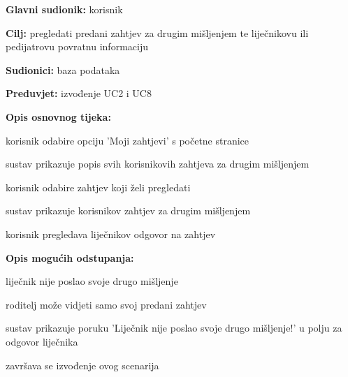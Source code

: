                     \noindent {}
					\begin{packed_item}
	
						\item \textbf{Glavni sudionik: }korisnik
						\item  \textbf{Cilj:} pregledati predani zahtjev za drugim mišljenjem te liječnikovu ili pedijatrovu povratnu informaciju 
						\item  \textbf{Sudionici:} baza podataka
						\item  \textbf{Preduvjet:} izvođenje UC2 i UC8
						\item  \textbf{Opis osnovnog tijeka:}
						
						\item[] \begin{packed_enum}
	
							\item korisnik odabire opciju 'Moji zahtjevi' s početne stranice
							\item sustav prikazuje popis svih korisnikovih zahtjeva za drugim mišljenjem
							\item korisnik odabire zahtjev koji želi pregledati
                            \item sustav prikazuje korisnikov zahtjev za drugim mišljenjem
                            \item korisnik pregledava liječnikov odgovor na zahtjev

						\end{packed_enum}
						
						\item  \textbf{Opis mogućih odstupanja:}
						
						\item[] \begin{packed_item}
	
							\item[5.a] liječnik nije poslao svoje drugo mišljenje
							\item[] \begin{packed_enum}
								\item roditelj može vidjeti samo svoj predani zahtjev
								\item sustav prikazuje poruku 'Liječnik nije poslao svoje drugo mišljenje!' u polju za odgovor liječnika
								\item završava se izvođenje ovog scenarija 
							\end{packed_enum}
							
						\end{packed_item}
					\end{packed_item}

